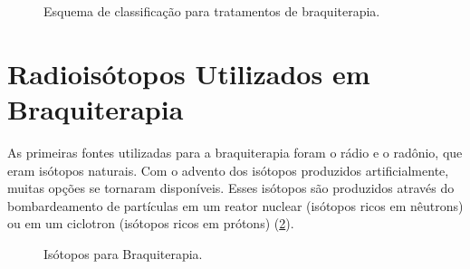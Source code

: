 \documentclass[11pt,a4paper]{article}
\begin{document}
	\begin{figure}[h]
		\centering
		\caption{Esquema de classificação para tratamentos de braquiterapia.}
		\label{fig:classificacoesBraqui}
	\end{figure}

	
\section{Radioisótopos Utilizados em Braquiterapia}

	As primeiras fontes utilizadas para a braquiterapia foram o rádio e o radônio, que eram isótopos naturais. Com o advento dos isótopos produzidos artificialmente, muitas opções se tornaram disponíveis. Esses isótopos são produzidos através do bombardeamento de partículas em um reator nuclear (isótopos ricos em nêutrons) ou em um ciclotron (isótopos ricos em prótons) (\ref{fig:isotoposUtilizadosEmBraqu}).

	\begin{figure}[h]
		\centering
		\caption{Isótopos para Braquiterapia.}
		\label{fig:isotoposUtilizadosEmBraqu}
	\end{figure}
\end{document}
